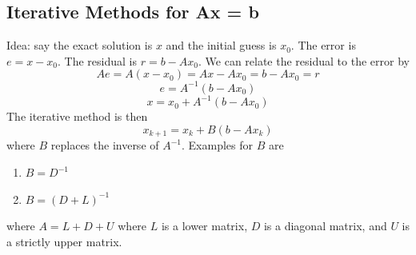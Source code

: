 \documentclass[11pt]{article}
\begin{document}
\subsection{Iterative Methods for Ax = b}
Idea: say the exact solution is $x$ and the initial guess is $x_0$. The error is $e = x-x_0$. The residual is $r = b - Ax_0$.
We can relate the residual to the error by
\[
    Ae = A(x-x_0) = Ax-Ax_0 = b-Ax_0 = r
\]
\[
    e = A^{-1}(b-Ax_0)
\]
\[
    x = x_0 + A^{-1}(b-Ax_0)
\]
The iterative method is then
\[
    x_{k+1} = x_k + B(b-Ax_k)
\]
where $B$ replaces the inverse of $A^{-1}$. Examples for $B$ are
\begin{enumerate}
    \item $B = D^{-1}$
    \item $B = (D+L)^{-1}$
\end{enumerate}
where $A = L+D+U$ where $L$ is a lower matrix, $D$ is a diagonal matrix, and $U$ is a strictly upper matrix.
\end{document}

